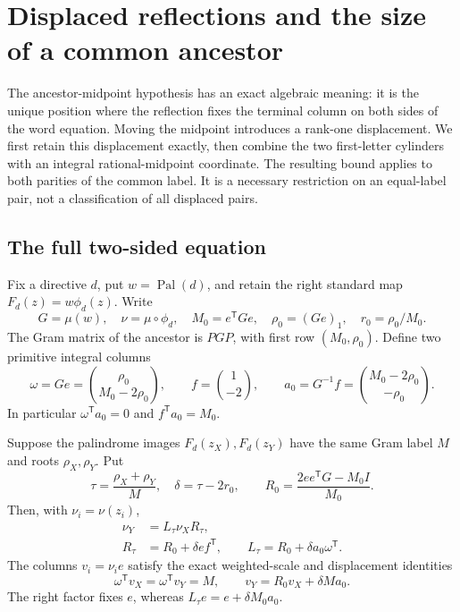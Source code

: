 \section{Displaced reflections and the size of a common ancestor}
\label{sec:displaced}

The ancestor-midpoint hypothesis has an exact algebraic meaning: it is the unique position where the reflection fixes the terminal column on both sides of the word equation. Moving the midpoint introduces a rank-one displacement. We first retain this displacement exactly, then combine the two first-letter cylinders with an integral rational-midpoint coordinate. The resulting bound applies to both parities of the common label. It is a necessary restriction on an equal-label pair, not a classification of all displaced pairs.

\subsection{The full two-sided equation}

Fix a directive $d$, put $w=\operatorname{Pal}(d)$, and retain the right standard map $F_d(z)=w\phi_d(z)$. Write
$$
 G=\mu(w),\quad \nu=\mu\circ\phi_d,\quad
 M_0=e^{\mathsf T}Ge,\quad \rho_0=(Ge)_1,\quad r_0=\rho_0/M_0.
$$
The Gram matrix of the ancestor is $PGP$, with first row $(M_0,\rho_0)$. Define two primitive integral columns
\begin{equation}
 \omega=Ge=\binom{\rho_0}{M_0-2\rho_0},\qquad
 f=\binom1{-2},\qquad a_0=G^{-1}f=\binom{M_0-2\rho_0}{-\rho_0}.
 \label{eq:displaced-columns}
\end{equation}
In particular $\omega^{\mathsf T}a_0=0$ and $f^{\mathsf T}a_0=M_0$.

\begin{proposition}
\label{prop:displaced-equation}
Suppose the palindrome images $F_d(z_X),F_d(z_Y)$ have the same Gram label $M$ and roots $\rho_X,\rho_Y$. Put
$$
 \tau=\frac{\rho_X+\rho_Y}{M},\quad \delta=\tau-2r_0,
 \qquad R_0=\frac{2ee^{\mathsf T}G-M_0I}{M_0}.
$$
Then, with $\nu_i=\nu(z_i)$,
\begin{align}
 \nu_Y&=L_\tau\nu_XR_\tau,
 \label{eq:displaced-full-word}\\
 R_\tau&=R_0+\delta ef^{\mathsf T},\qquad
 L_\tau=R_0+\delta a_0\omega^{\mathsf T}.
 \label{eq:displaced-left-right}
\end{align}
The columns $v_i=\nu_i e$ satisfy the exact weighted-scale and displacement identities
\begin{equation}
 \omega^{\mathsf T}v_X=\omega^{\mathsf T}v_Y=M,
 \qquad v_Y=R_0v_X+\delta M a_0.
 \label{eq:displaced-weighted-columns}
\end{equation}
The right factor fixes $e$, whereas $L_\tau e=e+\delta M_0a_0$.
\end{proposition}

